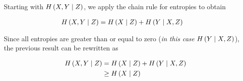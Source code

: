 \documentclass[ClusteringConnectionsMAIN.tex]{subfiles}
\begin{document}
	

  Starting with $H \left( X, Y \mid Z \right)$, we apply the chain rule for entropies to obtain

\begin{align}
H \left( X, Y \mid Z \right) &= H \left( X \mid Z \right) + H \left( Y \mid X, Z \right) \notag
\end{align}

Since all entropies are greater than or equal to zero (\emph{in this case} $H \left( Y \mid X, Z \right)$), the previous result can be rewritten as

\begin{align}
H \left( X, Y \mid Z \right) &= H \left( X \mid Z \right) + H \left( Y \mid X, Z \right) \notag \\
&\geq H \left( X \mid Z \right) \notag
\end{align}
\end{document}
